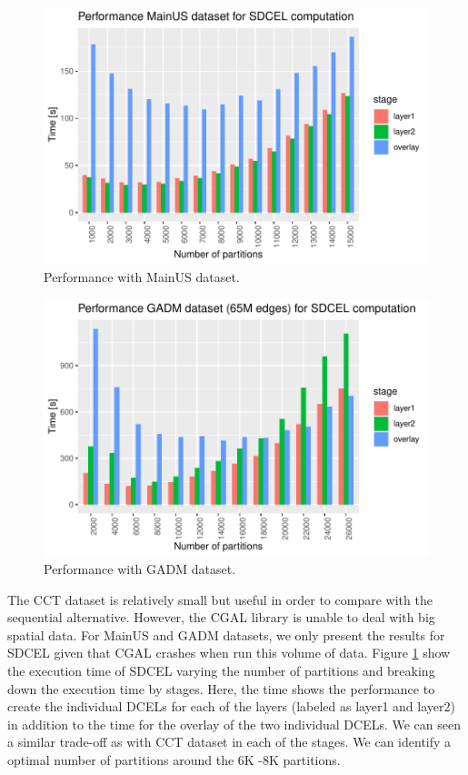 \begin{figure}[!ht]
    \centering
    \includegraphics[width=\linewidth]{figures/experiments/MainUS/MainUS.pdf}
    \caption{Performance with MainUS dataset.} \label{fig:mainus}
\end{figure}

\begin{figure}[!ht]
    \centering
    \includegraphics[width=\linewidth]{figures/experiments/GADM/GADM.pdf}
    \caption{Performance with GADM dataset.} \label{fig:gadm}
\end{figure}

The CCT dataset is relatively small but useful in order to compare with the sequential alternative.  However, the CGAL library is unable to deal with big spatial data.  For MainUS and GADM datasets, we only present the results for SDCEL given that CGAL crashes when run this volume of data.  Figure \ref{fig:mainus} show the execution time of SDCEL varying the number of partitions and breaking down the execution time by stages.  Here, the time shows the performance to create the individual DCELs for each of the layers (labeled as layer1 and layer2) in addition to the time for the overlay of the two individual DCELs.  We can seen a similar trade-off as with CCT dataset in each of the stages.  We can identify a optimal number of partitions around the 6K -8K partitions.  

